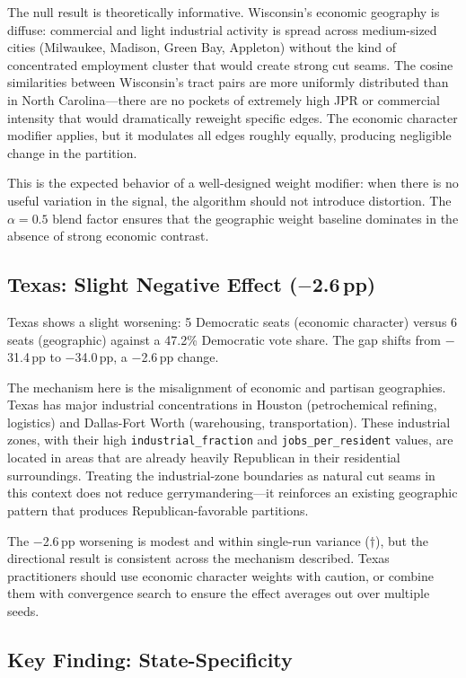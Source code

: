 The null result is theoretically informative.
Wisconsin's economic geography is diffuse: commercial and light industrial
activity is spread across medium-sized cities (Milwaukee, Madison, Green Bay,
Appleton) without the kind of concentrated employment cluster that would
create strong cut seams.
The cosine similarities between Wisconsin's tract pairs are more uniformly
distributed than in North Carolina---there are no pockets of extremely high
JPR or commercial intensity that would dramatically reweight specific edges.
The economic character modifier applies, but it modulates all edges roughly
equally, producing negligible change in the partition.

This is the expected behavior of a well-designed weight modifier: when there
is no useful variation in the signal, the algorithm should not introduce
distortion.
The $\alpha = 0.5$ blend factor ensures that the geographic weight baseline
dominates in the absence of strong economic contrast.

\subsection{Texas: Slight Negative Effect ($-$2.6\,pp)}

Texas shows a slight worsening: 5 Democratic seats (economic character) versus
6 seats (geographic) against a 47.2\% Democratic vote share.
The gap shifts from $-$31.4\,pp to $-$34.0\,pp, a $-$2.6\,pp change.

The mechanism here is the misalignment of economic and partisan geographies.
Texas has major industrial concentrations in Houston (petrochemical refining,
logistics) and Dallas-Fort Worth (warehousing, transportation).
These industrial zones, with their high \texttt{industrial\_fraction} and
\texttt{jobs\_per\_resident} values, are located in areas that are already
heavily Republican in their residential surroundings.
Treating the industrial-zone boundaries as natural cut seams in this context
does not reduce gerrymandering---it reinforces an existing geographic pattern
that produces Republican-favorable partitions.

The $-$2.6\,pp worsening is modest and within single-run variance ($\dagger$),
but the directional result is consistent across the mechanism described.
Texas practitioners should use economic character weights with caution,
or combine them with convergence search to ensure the effect averages out
over multiple seeds.

\subsection{Key Finding: State-Specificity}

